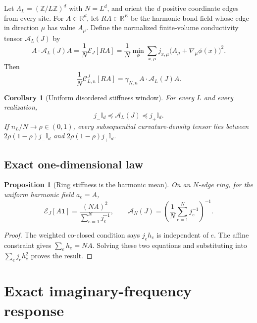 \documentclass[11pt]{article}
\newtheorem{proposition}[theorem]{Proposition}
\newtheorem{corollary}[theorem]{Corollary}
\theoremstyle{definition}
\theoremstyle{remark}
\newcommand{\Id}{\mathbb I}
\newcommand{\R}{\mathbb R}
\newcommand{\Z}{\mathbb Z}
\newcommand{\cC}{\mathcal C}
\newcommand{\cE}{\mathcal E}
\newcommand{\cA}{\mathcal A}
\begin{document}
Let $\Lambda_L=(\Z/L\Z)^d$ with $N=L^d$, and orient the $d$ positive coordinate edges from every site.  For $A\in\R^d$, let $R A\in\R^E$ be the harmonic bond field whose edge in direction $\mu$ has value $A_\mu$.  Define the normalized finite-volume conductivity tensor $\cA_L(J)$ by
\begin{equation}
 A\cdot\cA_L(J)A
 =\frac1N\cE_J[RA]
 =\frac1N\min_{\phi}\sum_{x,\mu}
 j_{x,\mu}\bigl(A_\mu+\nabla_\mu\phi(x)\bigr)^2.
 \label{eq:finite-cell}
\end{equation}
Then
\begin{equation}
 \frac1N\cC_{L,n}^{J}[RA]
 =\gamma_{N,n}\,A\cdot\cA_L(J)A.
 \label{eq:curvature-density}
\end{equation}

\begin{corollary}[Uniform disordered stiffness window]
\label{cor:tensor-bounds}
For every $L$ and every realization,
\begin{equation}
 \boxed{j_-\Id_d\preceq\cA_L(J)\preceq j_+\Id_d.}
 \label{eq:tensor-bounds}
\end{equation}
If $n_L/N\to\rho\in(0,1)$, every subsequential curvature-density tensor lies between
$2\rho(1-\rho)j_-\Id_d$ and $2\rho(1-\rho)j_+\Id_d$.
\end{corollary}

\subsection{Exact one-dimensional law}

\begin{proposition}[Ring stiffness is the harmonic mean]
\label{prop:ring}
On an $N$-edge ring, for the uniform harmonic field $a_e=A$,
\begin{equation}
 \boxed{
 \cE_J[A\bm{1}]
 =\frac{(NA)^2}{\sum_{e=1}^Nj_e^{-1}},
 \qquad
 \cA_N(J)=\left(\frac1N\sum_{e=1}^Nj_e^{-1}\right)^{-1}.}
 \label{eq:ring-harmonic}
\end{equation}
\end{proposition}

\begin{proof}
The weighted co-closed condition says $j_eh_e$ is independent of $e$.  The affine constraint gives $\sum_eh_e=NA$.  Solving these two equations and substituting into $\sum_ej_eh_e^2$ proves the result.
\end{proof}

\section{Exact imaginary-frequency response}
\label{sec:dynamic}
\end{document}
